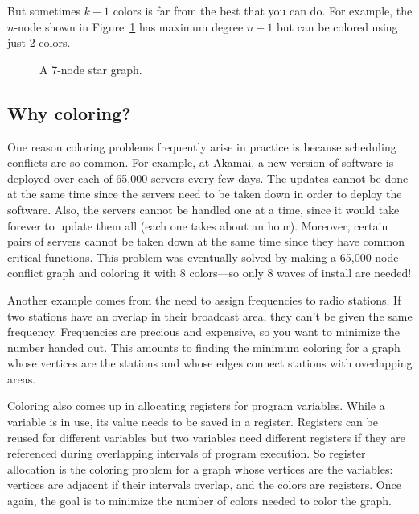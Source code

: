 But sometimes $k+1$ colors is far from the best that you can do.
For example, the $n$-node  shown in
Figure~\ref{fig:5T} has maximum degree $n - 1$ but can be colored
using just 2 colors.

\begin{figure}


\caption{A 7-node star graph.}

\label{fig:5T}

\end{figure}


\subsection{Why coloring?}

One reason coloring problems frequently arise in practice is because
scheduling conflicts are so common.  For example, at Akamai, a new
version of software is deployed over each of 65,000 servers every few
days.  The updates cannot be done at the same time since the servers
need to be taken down in order to deploy the software.  Also, the
servers cannot be handled one at a time, since it would take forever
to update them all (each one takes about an hour).  Moreover, certain
pairs of servers cannot be taken down at the same time since they have
common critical functions.  This problem was eventually solved by
making a 65,000-node conflict graph and coloring it with 8 colors---so
only 8 waves of install are needed!

Another example comes from the need to assign frequencies to radio
stations.  If two stations have an overlap in their broadcast area, they
can't be given the same frequency.  Frequencies are precious and
expensive, so you want to minimize the number handed out.  This amounts to
finding the minimum coloring for a graph whose vertices are the stations
and whose edges connect stations with overlapping areas.

Coloring also comes up in allocating registers for program variables.
While a variable is in use, its value needs to be saved in a register.
Registers can be reused for different variables but two variables need
different registers if they are referenced during overlapping
intervals of program execution.  So register allocation is the
coloring problem for a graph whose vertices are the variables:
vertices are adjacent if their intervals overlap, and the colors are
registers.  Once again, the goal is to minimize the number of colors
needed to color the graph.

